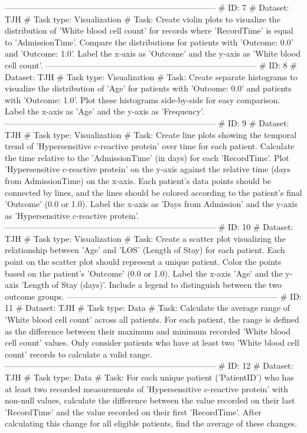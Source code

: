 \begin{tcolorbox}[colback=cadmiumgreen!5!white,colframe=forestgreen!75!white,breakable,title=\textit{Generated analytical tasks in task 4.}]
\begin{VerbatimWrap}
-----------------------------------------------------------------------------
# ID: 7  
# Dataset: TJH 
# Task type: Visualization
# Task: Create violin plots to visualize the distribution of 'White blood cell count' for records where 'RecordTime' is equal to 'AdmissionTime'. Compare the distributions for patients with 'Outcome: 0.0' and 'Outcome: 1.0'. Label the x-axis as 'Outcome' and the y-axis as 'White blood cell count'.
-----------------------------------------------------------------------------
# ID: 8  
# Dataset: TJH 
# Task type: Visualization
# Task: Create separate histograms to visualize the distribution of 'Age' for patients with 'Outcome: 0.0' and patients with 'Outcome: 1.0'. Plot these histograms side-by-side for easy comparison. Label the x-axis as 'Age' and the y-axis as 'Frequency'.
-----------------------------------------------------------------------------
# ID: 9  
# Dataset: TJH 
# Task type: Visualization
# Task: Create line plots showing the temporal trend of 'Hypersensitive c-reactive protein' over time for each patient. Calculate the time relative to the 'AdmissionTime' (in days) for each 'RecordTime'. Plot 'Hypersensitive c-reactive protein' on the y-axis against the relative time (days from AdmissionTime) on the x-axis. Each patient's data points should be connected by lines, and the lines should be colored according to the patient's final 'Outcome' (0.0 or 1.0). Label the x-axis as 'Days from Admission' and the y-axis as 'Hypersensitive c-reactive protein'.
-----------------------------------------------------------------------------
# ID: 10  
# Dataset: TJH 
# Task type: Visualization
# Task: Create a scatter plot visualizing the relationship between 'Age' and 'LOS' (Length of Stay) for each patient. Each point on the scatter plot should represent a unique patient. Color the points based on the patient's 'Outcome' (0.0 or 1.0). Label the x-axis 'Age' and the y-axis 'Length of Stay (days)'. Include a legend to distinguish between the two outcome groups.
-----------------------------------------------------------------------------
# ID: 11  
# Dataset: TJH 
# Task type: Data
# Task: Calculate the average range of 'White blood cell count' across all patients. For each patient, the range is defined as the difference between their maximum and minimum recorded 'White blood cell count' values. Only consider patients who have at least two 'White blood cell count' records to calculate a valid range.
-----------------------------------------------------------------------------
# ID: 12  
# Dataset: TJH 
# Task type: Data
# Task: For each unique patient ('PatientID') who has at least two recorded measurements of 'Hypersensitive c-reactive protein' with non-null values, calculate the difference between the value recorded on their last 'RecordTime' and the value recorded on their first 'RecordTime'. After calculating this change for all eligible patients, find the average of these changes.

\end{VerbatimWrap}
\end{tcolorbox}
